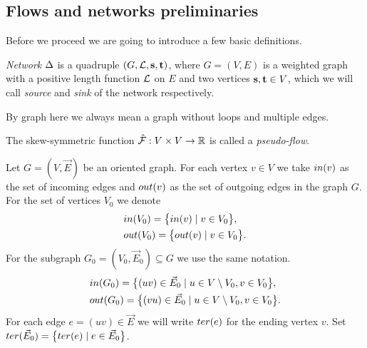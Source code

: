 \documentclass[12pt]{amsart}
\begin{document}
    \subsection{Flows and networks preliminaries}

    Before we proceed we are going to introduce a few basic definitions.
    \begin{definition}
      \emph{Network} $\Delta$ is a quadruple $(G, \mathcal{L}, \mathbf{s}, \mathbf{t})$, where $G = (V, E)$ is a weighted graph
      with a positive length function $\mathcal{L}$ on $E$ and two vertices $\mathbf{s}, \mathbf{t} \in V$, which
      we will call \emph{source} and \emph{sink} of the network respectively.
    \end{definition}
    By graph here we always mean a graph without loops and multiple edges.
    \begin{definition}
      The skew-symmetric function $\mathcal{\hat{F}}: V \times V \to \mathbb{R}$ is called a \emph{pseudo-flow}.
    \end{definition}
    \begin{definition}
      Let $G = (V, \vec{E})$ be an oriented graph.
      For each vertex $v \in V$ we take $in(v)$ as the set of incoming edges
        and $out(v)$ as the set of outgoing edges in the graph $G$.
      For the set of vertices $V_0$ we denote
      \begin{align*}
        &in(V_0) = \big\{in(v) \mid v\in V_0\big\},\\
        &out(V_0) = \big\{out(v) \mid v\in V_0\big\}.
      \end{align*}
      For the subgraph $G_0 = (V_0, \vec{E}_0) \subseteq G$ we use the same notation.
      \begin{align*}
        &in(G_0) = \big\{(uv)\in \vec{E}_0 \mid u \in V \setminus V_0, v \in V_0\big\},\\
        &out(G_0) = \big\{(vu) \in \vec{E}_0 \mid u \in V\setminus V_0, v \in V_0\big\}.
      \end{align*}
      For each edge $e=(uv) \in \vec{E}$ we will write %
        $ter(e)$ for the ending vertex $v$.
      Set $ter(\vec{E}_0) = \big\{ter(e) \mid e\in \vec{E}_0\big\}$.
    \end{definition}
\end{document}
